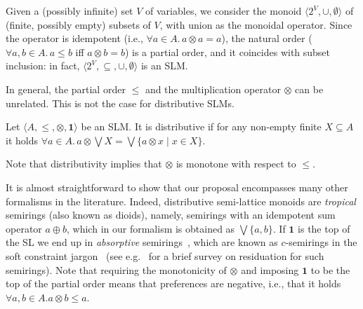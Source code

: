 \documentclass{llncs}
\def\monid{{\mathbf 0}}
\def\monop{\otimes}
\def\monid{\mathbf{1}}
\begin{document}
\begin{example}\label{ex:powerset}
	Given a (possibly infinite) set $V$ of variables, we consider
	the monoid $\langle 2^V, \cup, \emptyset \rangle$
	of (finite, possibly empty) subsets of $V$, with union as the monoidal operator.
	Since the operator is idempotent (i.e., $\forall a\in A.\, a \monop a = a$), 
	the natural order ($\forall a, b \in A.\, a \leq b$ iff $a \monop b = b$) 
	is a partial order, and 
	it coincides with subset inclusion:
	in fact, $\langle 2^V, \subseteq, \cup, \emptyset \rangle$
	is an SLM.
\end{example}

In general, the partial order $\leq$ and the multiplication operator $\otimes$ can be unrelated.
This is not the case for distributive SLMs.

\begin{definition}[Distributivity]
\label{dist}
Let $\langle A, \leq, \monop, \monid \rangle$ be an SLM.
It is distributive if
	for  any  non-empty finite  $X \subseteq A$
		it holds $\forall a \in A.\,  a \monop  \bigvee X = \bigvee \{a \monop x \mid x \in X\}$.
\end{definition}

Note that distributivity implies that $\otimes$ is monotone with respect to $\leq$.
\begin{remark}

	It is almost straightforward to show that our proposal encompasses many other formalisms in the literature.
	Indeed, distributive semi-lattice monoids are \emph{tropical} semirings (also known as dioids), 
	namely, semirings with an idempotent sum operator $a \oplus b$, which in our formalism is obtained as
	$\bigvee \{a, b\}$.
	If $\monid$ is the top of the SL we end up 
	in \emph{absorptive} semirings~\cite{golanShort}, 
	which are known as $c$-semirings 
	in the soft constraint jargon~\cite{jacm97} (see e.g.~\cite{ecai06} for a brief survey on residuation 
	for such semirings).
	Note that requiring the monotonicity of $\otimes$ and imposing $\monid$ to be the top of the partial order
	means that preferences are negative, i.e., 
	that it holds $\forall a, b \in A. a \monop b \leq a$.
\end{remark}
\end{document}
